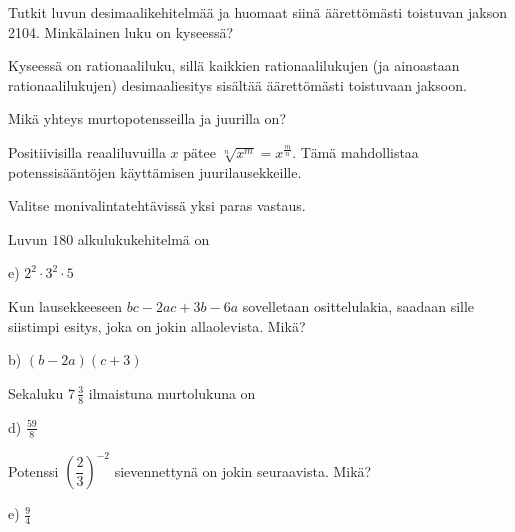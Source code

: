 \begin{tehtava}
Tutkit luvun desimaalikehitelmää ja huomaat siinä äärettömästi toistuvan jakson 2104. Minkälainen luku on kyseessä?
\begin{vastaus}
Kyseessä on rationaaliluku, sillä kaikkien rationaalilukujen (ja ainoastaan rationaalilukujen) desimaaliesitys sisältää äärettömästi toistuvaan jaksoon.
\end{vastaus}
\end{tehtava}

\begin{tehtava}
Mikä yhteys murtopotensseilla ja juurilla on?
\begin{vastaus}
Positiivisilla reaaliluvuilla $x$ pätee $\sqrt[n]{x^m} = x^{\frac{m}{n}}$. Tämä mahdollistaa potenssisääntöjen käyttämisen juurilausekkeille.
\end{vastaus}
\end{tehtava}

Valitse monivalintatehtävissä yksi paras vastaus.

\begin{tehtava}
Luvun $180$ alkulukukehitelmä on
	\begin{vastaus}
	 e) $2^2\cdot3^2\cdot5$
	\end{vastaus}
\end{tehtava}

\begin{tehtava}
Kun lausekkeeseen $bc-2ac+3b-6a$ sovelletaan osittelulakia, saadaan sille siistimpi esitys, joka on jokin allaolevista. Mikä?
    \begin{vastaus}
	b) $(b-2a)(c+3)$
    \end{vastaus}
\end{tehtava}

\begin{tehtava}
Sekaluku $7\,\frac{3}{8}$ ilmaistuna murtolukuna on
    \begin{vastaus}
	 d) $\frac{59}{8}$
    \end{vastaus}
\end{tehtava}

\begin{tehtava}
Potenssi $\left( \dfrac{2}{3} \right)^{-2}$ sievennettynä on jokin seuraavista. Mikä?
\begin{vastaus}
e) $\frac{9}{4}$
\end{vastaus}
\end{tehtava}

